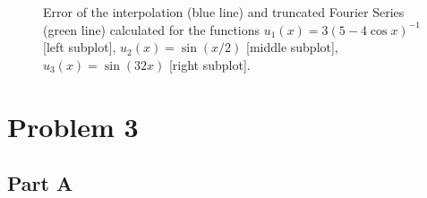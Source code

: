\documentclass[12pt]{article}
\begin{document}
\begin{figure}[!h]
    \caption{
        Error of the interpolation (blue line) and truncated Fourier Series (green line) calculated for the functions $u_{1}(x) = 3\left(5-4\cos x\right)^{-1}$ [left subplot], 
        $u_{2}(x) = \sin(x/2)$ [middle subplot], $u_{3}(x) = \sin(32x)$ [right subplot]. 
    }
    \label{fig:q2b_interpolant_truncation_error_plot}
\end{figure}

\section*{Problem 3}

\subsection*{Part A}
\end{document}
